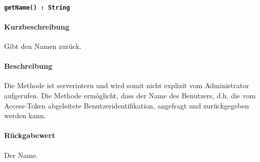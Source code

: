 \paragraph{\texttt{getName() : String}}%
\paragraph*{Kurzbeschreibung}
Gibt den Namen zurück.
\paragraph*{Beschreibung}
Die Methode ist serverintern und wird somit nicht explizit vom Administrator aufgerufen.
Die Methode ermöglicht, dass der Name des Benutzers, d.h. die vom Access-Token abgeleitete Benutzeridentifikation, angefragt und zurückgegeben werden kann.
\paragraph*{Rückgabewert}
Der Name.
